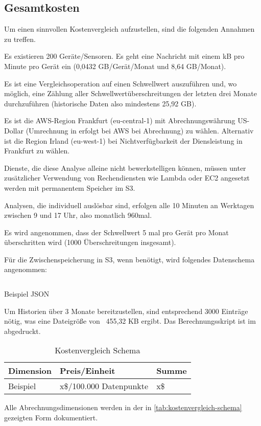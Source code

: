 \subsection{Gesamtkosten}
Um einen sinnvollen Kostenvergleich aufzustellen, sind die folgenden Annahmen zu treffen.


Es existieren 200 Geräte/Sensoren. Es geht eine Nachricht mit einem kB pro Minute pro Gerät ein (0,0432 GB/Gerät/Monat und 8,64 GB/Monat).

Es ist eine Vergleichsoperation auf einen Schwellwert auszuführen und, wo möglich, eine Zählung aller Schwellwertüberschreitungen der letzten drei Monate durchzuführen (historische Daten also mindestens 25,92 GB).  

Es ist die \ac{AWS}-Region Frankfurt (eu-central-1) mit Abrechnungswährung US-Dollar (Umrechnung in \texteuro{} erfolgt bei \ac{AWS} bei Abrechnung) zu wählen. Alternativ ist die Region Irland (eu-west-1) bei Nichtverfügbarkeit der Diensleistung in Frankfurt zu wählen. 

Dienste, die diese Analyse alleine nicht bewerkstelligen können, müssen unter zusätzlicher Verwendung von Rechendiensten wie Lambda oder \ac{EC2} angesetzt werden mit permanentem Speicher im \ac{S3}. 

Analysen, die individuell auslösbar sind, erfolgen alle 10 Minuten an Werktagen zwischen 9 und 17 Uhr, also monatlich 960mal. 

Es wird angenommen, dass der Schwellwert 5 mal pro Gerät pro Monat überschritten wird (1000 Überschreitungen insgesamt).

Für die Zwischenspeicherung in \ac{S3}, wenn benötigt, wird folgendes Datenschema angenommen:
\begin{listing}[H]
\inputminted[frame=lines,breaklines=true]{json}{code/estimates/filtered-estimate.json}
\caption[Beispiel JSON]{Beispiel \ac{JSON}}
\label{listing:json}
\end{listing}
Um Historien über 3 Monate bereitzustellen, sind entsprechend 3000 Einträge nötig, was eine Dateigröße von ~455,32 KB ergibt. Das Berechnungsskript ist im  abgedruckt.


\begin{table}[H]
\centering
\begin{tabular}{|l|l|l|}
\hline
Dimension & Preis/Einheit           & Summe \\ \hline
Beispiel  & x\$/100.000 Datenpunkte & x\$  \\\hline
\end{tabular}
\caption{Kostenvergleich Schema}
\label{tab:kostenvergleich-schema}
\end{table}
Alle Abrechnungsdimensionen werden in der in \autoref{tab:kostenvergleich-schema} gezeigten Form dokumentiert.
